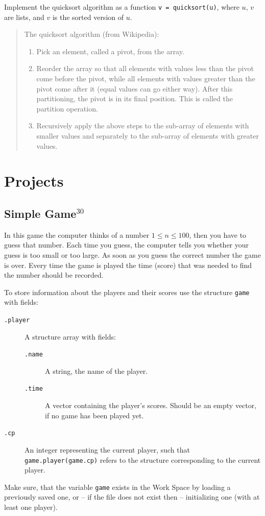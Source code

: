 \documentclass[a4paper, fleqn, 10pt]{report}
\theoremstyle{definition}
\newenvironment{prb*}[1]
  {\renewcommand\theprb{\thechapter.\arabic{prb}\rlap{$^{#1}$}}\prb}
  {\endprb}
\newcommand{\mc}[1]{{\color{Blue}\tt #1}}
\newcommand{\mck}[1]{{\tt#1}}
\begin{document}
\begin{prb*}{4}
Implement the quicksort algorithm as a function \mck{v = }\mc{quicksort}\mck{(u)}, where
$u,\,v$ are lists, and $v$ is the sorted version of $u.$
\begin{quote}
The quicksort algorithm (from Wikipedia):
\begin{enumerate}
 \item Pick an element, called a pivot, from the array.
 \item Reorder the array so that all elements with values less than the pivot come before the pivot, while all elements with values greater than the pivot come after it (equal values can go either way). After this partitioning, the pivot is in its final position. This is called the partition operation.
 \item Recursively apply the above steps to the sub-array of elements with smaller values and separately to the sub-array of elements with greater values.
\end{enumerate}


\end{quote}

\end{prb*}


\section{Projects}
\subsection*{Simple Game$^{30}$}
In this game the computer thinks of a number $ 1\le n\le 100$, then you have to guess that number.
Each time you guess, the computer tells you whether your guess is too small or too large.
As soon as you guess the correct number the game is over.
Every time the game is played the time (score) that was needed to find the number should be recorded.

To store information about the players and their scores use the structure \mck{game} with fields:
\begin{description}
 \item[\mck{.player}] A structure array with fields:
  \begin{description}
  \item[\mck{.name}] A string, the name of the player.
  \item[\mck{.time}] A vector containing the player's scores. Should be an empty vector, if no game has been played yet.
 \end{description}
 \item[\mck{.cp}] An integer representing the current player, such that \mck{game.player(game.cp)} refers to the
		  structure corresponding to the current player.
\end{description}
Make sure, that the variable \mck{game} exists in the Work Space by
loading a previously saved one, or -- if the file does not exist then -- initializing one (with at least one player). 
\end{document}
